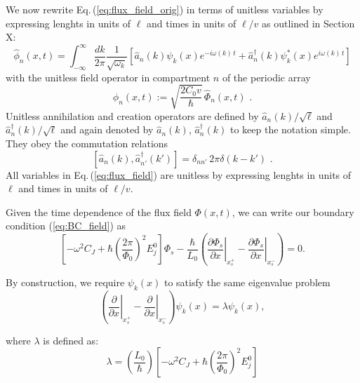 We now rewrite Eq.\,(\ref{eq:flux_field_orig}) in terms of unitless variables 
by expressing lenghts in units of $\ell$ and times in units of $\ell/v$
as outlined in \color{red} Section X:  \color{blue}  
%
\begin{equation} \label{eq:flux_field}
    \hat{\phi}_n(x,t) = 
    \int_{-\infty}^{\infty}\frac{dk}{2 \pi} \frac{1}{\sqrt{\omega_k}}
    \left[ \hat{a}_n(k) \psi_k(x)e^{-i \omega(k) \, t} + 
    \hat{a}_n^{\dagger}(k) \psi_k^*(x) e^{i \omega(k) \, t} \right]
\end{equation}
%
with the unitless field operator in compartment $n$ of the periodic array
%
\begin{equation} \label{eq:ufo}
\hat{\phi}_n(x,t) := \sqrt{\frac{2 C_0 v}{\hbar}} \, \hat{\Phi}_n(x,t) \, \, .
\end{equation}
%
Unitless annihilation and creation operators are defined by $\hat{a}_n(k)/\sqrt{\ell}$ 
and ${\hat a}_{n}^\dagger(k) / \sqrt{\ell}$ and again denoted by
$\hat{a}_n(k)$, ${\hat a}_{n}^\dagger(k)$ to keep the notation simple. 
They obey the commutation relations 
%
\begin{equation} \label{eq:cra}
    \left[ \hat{a}_n(k),{\hat a}_{n'}^\dagger(k') \right] = \delta_{nn'} \, 2 \pi \delta(k - k') \, \, .
\end{equation}
%
All variables in Eq.\,(\ref{eq:flux_field}) are unitless by expressing lenghts in units of $\ell$
and times in units of $\ell/v$.


\color{black}


Given the time dependence of the flux field $\Phi(x,t)$, we can write our boundary condition (\ref{eq:BC_field}) as
\begin{equation}
\left[-\omega^2 C_{J}+\hbar\left(\frac{2 \pi}{\Phi_{0}}\right)^{2} E_{j}^0\right]\Phi_{s} -\frac{\hbar}{L_{0}}\left(\left.\frac{\partial \Phi_{s}}{\partial x}\right|_{x_s^{+}}-\left.\frac{\partial \Phi_{s}}{\partial x}\right|_{x_s^{-}}\right)=0.
\end{equation}

By construction, we require $\psi_k(x)$ to satisfy the same eigenvalue problem
\begin{equation}\label{eq:BC_bloch}
\left(\left.\frac{\partial}{\partial x}\right|_{x_s^{+}}-\left.\frac{\partial}{\partial x}\right|_{x_s^{-}}\right)\psi_{k}(x)=\lambda \psi_k(x),
\end{equation}

where $\lambda$ is defined as:
\begin{equation}
\lambda = \left(\frac{L_0}{\hbar}\right)  
\left[-\omega^2 C_{J}+\hbar\left(\frac{2 \pi}{\Phi_{0}}\right)^{2} E_{j}^0\right]
\end{equation}

